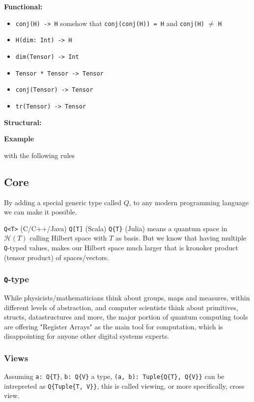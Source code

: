 \documentclass[a4paper,11pt]{article}
\def\co{\lstinline}
\begin{document}
\textbf{Functional: }

\begin{itemize}
	\item \co|conj(H) -> H|
        somehow that \co|conj(conj(H)) = H| and \co|conj(H)| \(\ne\) \co|H|
	\item \co|H(dim: Int) -> H|
    \item \co|dim(Tensor) -> Int|
	\item \co|Tensor * Tensor -> Tensor|
	\item \co|conj(Tensor) -> Tensor|
	\item \co|tr(Tensor) -> Tensor|
\end{itemize}

\textbf{Structural: }

\textbf{Example}

with the following rules

\subsection{Core}

By adding a special generic type called $Q$, to any modern programming language we can make it possible.

\co{Q<T>} (C/C++/Java) \co{Q[T]} (Scala) \co|Q{T}| (Julia) means a quantum space in $\mathcal{H}(T)$ calling Hilbert space with $T$ as basis. But we know that having multiple \co{Q}-typed values, makes our Hilbert space much larger that is kronoker product (tensor product) of spaces/vectors.

\subsubsection{\co|Q|-type}
While physicists/mathematicians think about groups, maps and measures, within different levels of abstraction, and computer scientists think about primitives, structs, datastructures and more, the major portion of quantum computing tools are offering "Register Arrays" as the main tool for computation, which is disappointing for anyone other digital systems experts.

\subsubsection{Views}
Assuming \co|a: Q{T}|, \co|b: Q{V}| a type, \co|(a, b): Tuple{Q{T}, Q{V}}| can be intrepreted as \co|Q{Tuple{T, V}}|, this is called viewing, or more specifically, cross view.
\end{document}
